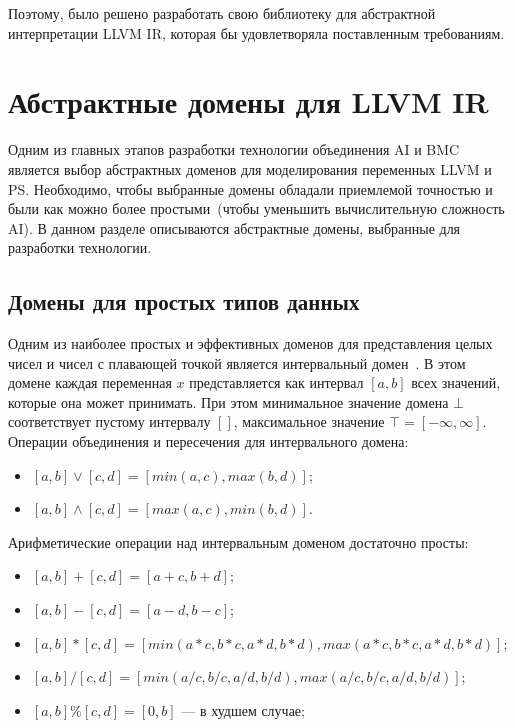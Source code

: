 Поэтому, было решено разработать свою библиотеку для абстрактной интерпретации
LLVM IR, которая бы удовлетворяла поставленным требованиям.

\section{Абстрактные домены для LLVM IR}
\label{section:domains}
Одним из главных этапов разработки технологии объединения AI и BMC является
выбор абстрактных доменов для моделирования переменных LLVM и PS. Необходимо,
чтобы выбранные домены обладали приемлемой точностью и были как можно более
простыми~(чтобы уменьшить вычислительную сложность AI). В данном разделе 
описываются абстрактные домены, выбранные для разработки технологии.

\subsection{Домены для простых типов данных}
Одним из наиболее простых и эффективных доменов для представления целых чисел и
чисел с плавающей точкой является интервальный домен~\cite{intervalAnalysis}.
В этом домене каждая 
переменная $x$ представляется как интервал $[a, b]$ всех значений, которые она 
может принимать. При этом минимальное значение домена $\bot$ соответствует 
пустому интервалу $[]$, максимальное значение $\top = [-\infty, \infty]$. 
Операции объединения и пересечения для интервального домена:
\begin{itemize}
\item $[a, b] \vee [c, d] = [min(a, c), max(b, d)]$;
\item $[a, b] \wedge [c, d] = [max(a, c), min(b, d)]$.
\end{itemize}

Арифметические операции над интервальным доменом достаточно просты:
\begin{itemize}
\item $[a, b] + [c, d] = [a + c, b + d]$;
\item $[a, b] - [c, d] = [a - d, b - c]$;
\item $[a, b] * [c, d] = [min(a * c, b * c, a * d, b * d), max(a * c, b * c,
a * d, b * d)]$;
\item $[a, b] / [c, d] = [min(a / c, b / c, a / d, b / d), max(a / c, b / c,
a / d, b / d)]$;
\item $[a, b] \% [c, d] = [0, b]$ --- в худшем случае;
\end{itemize}


